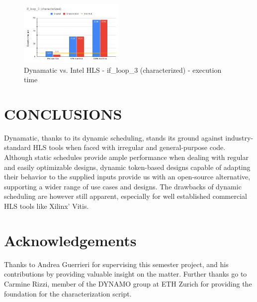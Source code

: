 \documentclass[final,5p,times,twocolumn]{elsarticle}
\begin{document}
\begin{spacing}{1.125}
\begin{figure}
	\centering 
	\includegraphics[width=0.45\textwidth]{dyn_char_runtime.png}	
	\caption{Dynamatic vs. Intel HLS - if\_loop\_3 (characterized) - execution time} 
	\label{fig_mom0}%
\end{figure}

\section{CONCLUSIONS}
Dynamatic, thanks to its dynamic scheduling, stands its ground against industry-standard HLS tools when faced with irregular and general-purpose code. Although static schedules provide ample performance when dealing with regular and easily optimizable designs, dynamic token-based designs capable of adapting their behavior to the supplied inputs provide us with an open-source alternative, supporting a wider range of use cases and designs. The drawbacks of dynamic scheduling are however still apparent, especially for well established commercial HLS tools like Xilinx' Vitis.


\section*{Acknowledgements}
Thanks to Andrea Guerrieri for supervising this semester project, and his contributions by providing valuable insight on the matter. Further thanks go to Carmine Rizzi, member of the DYNAMO group at ETH Zurich for providing the foundation for the characterization script.





\begin{thebibliography}{00}


\end{thebibliography}
\end{spacing}
\end{document}
